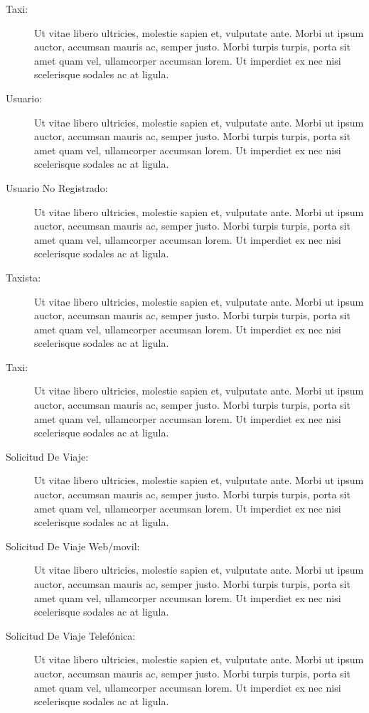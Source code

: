 \documentclass[a4paper, 10pt, twoside]{article}
\begin{document}
\begin{description}
  \item[Taxi:] Ut vitae libero ultricies, molestie sapien et, vulputate ante. Morbi ut ipsum auctor, accumsan mauris ac, semper justo. Morbi turpis turpis, porta sit amet quam vel, ullamcorper accumsan lorem. Ut imperdiet ex nec nisi scelerisque sodales ac at ligula.

  \item[Usuario:] Ut vitae libero ultricies, molestie sapien et, vulputate ante. Morbi ut ipsum auctor, accumsan mauris ac, semper justo. Morbi turpis turpis, porta sit amet quam vel, ullamcorper accumsan lorem. Ut imperdiet ex nec nisi scelerisque sodales ac at ligula.

  \item[Usuario No Registrado:] Ut vitae libero ultricies, molestie sapien et, vulputate ante. Morbi ut ipsum auctor, accumsan mauris ac, semper justo. Morbi turpis turpis, porta sit amet quam vel, ullamcorper accumsan lorem. Ut imperdiet ex nec nisi scelerisque sodales ac at ligula.

  \item[Taxista:] Ut vitae libero ultricies, molestie sapien et, vulputate ante. Morbi ut ipsum auctor, accumsan mauris ac, semper justo. Morbi turpis turpis, porta sit amet quam vel, ullamcorper accumsan lorem. Ut imperdiet ex nec nisi scelerisque sodales ac at ligula.

  \item[Taxi:] Ut vitae libero ultricies, molestie sapien et, vulputate ante. Morbi ut ipsum auctor, accumsan mauris ac, semper justo. Morbi turpis turpis, porta sit amet quam vel, ullamcorper accumsan lorem. Ut imperdiet ex nec nisi scelerisque sodales ac at ligula.

  \item[Solicitud De Viaje:] Ut vitae libero ultricies, molestie sapien et, vulputate ante. Morbi ut ipsum auctor, accumsan mauris ac, semper justo. Morbi turpis turpis, porta sit amet quam vel, ullamcorper accumsan lorem. Ut imperdiet ex nec nisi scelerisque sodales ac at ligula.

  \item[Solicitud De Viaje Web/movil:] Ut vitae libero ultricies, molestie sapien et, vulputate ante. Morbi ut ipsum auctor, accumsan mauris ac, semper justo. Morbi turpis turpis, porta sit amet quam vel, ullamcorper accumsan lorem. Ut imperdiet ex nec nisi scelerisque sodales ac at ligula.

  \item[Solicitud De Viaje Telefónica:] Ut vitae libero ultricies, molestie sapien et, vulputate ante. Morbi ut ipsum auctor, accumsan mauris ac, semper justo. Morbi turpis turpis, porta sit amet quam vel, ullamcorper accumsan lorem. Ut imperdiet ex nec nisi scelerisque sodales ac at ligula.


\end{description}
\end{document}
